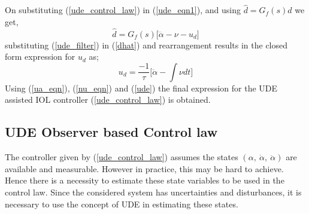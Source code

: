 \documentclass[conference]{IEEEtran}
\begin{document}
		On substituting (\ref{ude_control_law}) in (\ref{ude_eqn1}), and using $\hat{d}=G_f(s)d$ we get,
		\begin{equation}
			\hat{d}=G_f(s)\Big[\dddot{\alpha}-\nu-u_d\Big] \label{dhat}
		\end{equation}
		substituting (\ref{ude_filter}) in (\ref{dhat}) and rearrangement results in the closed form expression for $u_d$ as;
		\begin{equation}
			u_d=\frac{-1}{\tau}\Big[\ddot{\alpha}-\int{\nu dt}\Big] \label{ude}
		\end{equation}
		Using (\ref{ua_eqn}), (\ref{nu_eqn}) and (\ref{ude}) the final expression for the UDE assisted IOL controller (\ref{ude_control_law}) is obtained.

	\subsection{UDE Observer based Control law}
	
		 The controller given by (\ref{ude_control_law}) assumes the states $(\alpha,\ \dot{\alpha},\ \ddot{\alpha})$ are available and measurable. However in practice, this may be hard to achieve. Hence there is a necessity to estimate these state variables to be used in the control law. Since the considered system has uncertainties and disturbances, it is necessary to use the concept of UDE in estimating these states.
		 
\end{document}
